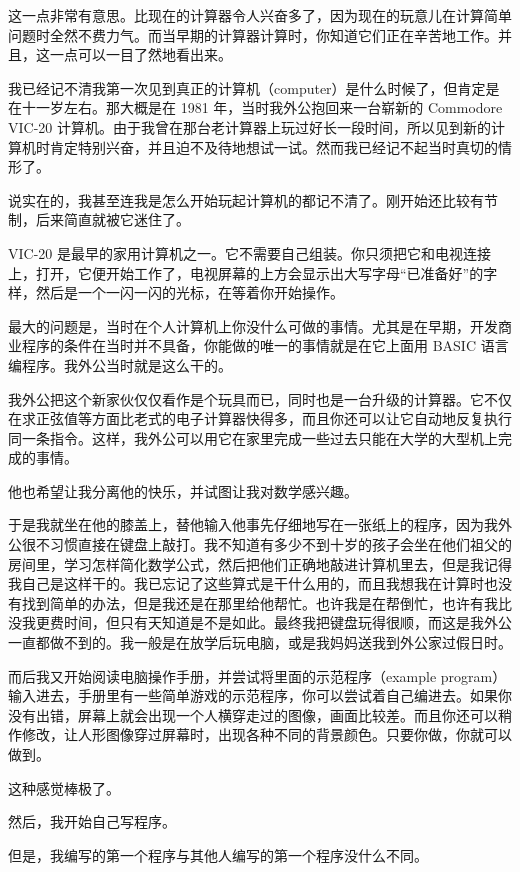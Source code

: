 这一点非常有意思。比现在的计算器令人兴奋多了，因为现在的玩意儿在计算简单问题时全然不费力气。而当早期的计算器计算时，你知道它们正在辛苦地工作。并且，这一点可以一目了然地看出来。

我已经记不清我第一次见到真正的计算机（computer）是什么时候了，但肯定是在十一岁左右。那大概是在 1981 年，当时我外公抱回来一台崭新的 Commodore VIC-20 计算机。由于我曾在那台老计算器上玩过好长一段时间，所以见到新的计算机时肯定特别兴奋，并且迫不及待地想试一试。然而我已经记不起当时真切的情形了。

说实在的，我甚至连我是怎么开始玩起计算机的都记不清了。刚开始还比较有节制，后来简直就被它迷住了。

VIC-20 是最早的家用计算机之一。它不需要自己组装。你只须把它和电视连接上，打开，它便开始工作了，电视屏幕的上方会显示出大写字母“已准备好”的字样，然后是一个一闪一闪的光标，在等着你开始操作。

最大的问题是，当时在个人计算机上你没什么可做的事情。尤其是在早期，开发商业程序的条件在当时并不具备，你能做的唯一的事情就是在它上面用 BASIC 语言编程序。我外公当时就是这么干的。

我外公把这个新家伙仅仅看作是个玩具而已，同时也是一台升级的计算器。它不仅在求正弦值等方面比老式的电子计算器快得多，而且你还可以让它自动地反复执行同一条指令。这样，我外公可以用它在家里完成一些过去只能在大学的大型机上完成的事情。

他也希望让我分离他的快乐，并试图让我对数学感兴趣。

于是我就坐在他的膝盖上，替他输入他事先仔细地写在一张纸上的程序，因为我外公很不习惯直接在键盘上敲打。我不知道有多少不到十岁的孩子会坐在他们祖父的房间里，学习怎样简化数学公式，然后把他们正确地敲进计算机里去，但是我记得我自己是这样干的。我已忘记了这些算式是干什么用的，而且我想我在计算时也没有找到简单的办法，但是我还是在那里给他帮忙。也许我是在帮倒忙，也许有我比没我更费时间，但只有天知道是不是如此。最终我把键盘玩得很顺，而这是我外公一直都做不到的。我一般是在放学后玩电脑，或是我妈妈送我到外公家过假日时。

而后我又开始阅读电脑操作手册，并尝试将里面的示范程序（example program）输入进去，手册里有一些简单游戏的示范程序，你可以尝试着自己编进去。如果你没有出错，屏幕上就会出现一个人横穿走过的图像，画面比较差。而且你还可以稍作修改，让人形图像穿过屏幕时，出现各种不同的背景颜色。只要你做，你就可以做到。

这种感觉棒极了。

然后，我开始自己写程序。

但是，我编写的第一个程序与其他人编写的第一个程序没什么不同。

